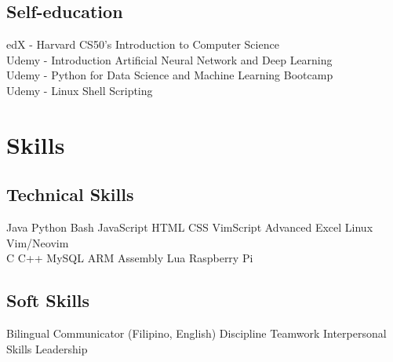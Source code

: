 \documentclass[]{deedy-resume-openfont}
\begin{document}
\begin{minipage}[t]{0.33\textwidth}
\subsection{Self-education}
edX - Harvard CS50's Introduction to Computer Science \\
Udemy - Introduction Artificial Neural Network and Deep Learning \\
Udemy - Python for Data Science and Machine Learning Bootcamp \\
Udemy - Linux Shell Scripting \\
\sectionsep


\section{Skills}
\subsection{Technical Skills}
Java \textbullet{} Python \textbullet{} Bash \textbullet{} JavaScript
\textbullet{} HTML \textbullet{} CSS \textbullet{} VimScript
\textbullet{} Advanced Excel \textbullet{} Linux \textbullet{} Vim/Neovim \\
C \textbullet{} C++ \textbullet{} MySQL \textbullet{} ARM Assembly \textbullet{}
Lua \textbullet{} Raspberry Pi
\sectionsep

\subsection{Soft Skills}
Bilingual Communicator (Filipino, English) \textbullet{} Discipline
\textbullet{} Teamwork \textbullet{} Interpersonal Skills \textbullet{}
Leadership

\end{minipage}
\end{document}
